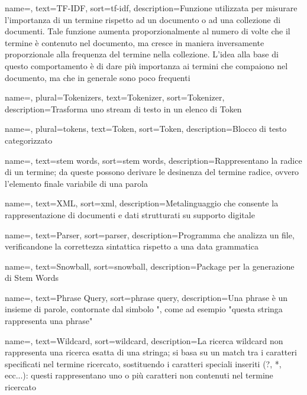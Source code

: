 {
	name=,
	text=TF-IDF,
	sort=tf-idf,
	description={Funzione utilizzata per misurare l'importanza di un termine rispetto ad un documento o ad una collezione di documenti. Tale funzione aumenta proporzionalmente al numero di volte che il termine è contenuto nel documento, ma cresce in maniera inversamente proporzionale alla frequenza del termine nella collezione. L'idea alla base di questo comportamento è di dare più importanza ai termini che compaiono nel documento, ma che in generale sono poco frequenti}
}

{
	name=,
	plural=Tokenizers,
	text=Tokenizer,
	sort=Tokenizer,
	description={Trasforma uno stream di testo in un elenco di \gls{Token}}
}

{
	name=,
	plural=tokens,
	text=Token,
	sort=Token,
	description={Blocco di testo categorizzato}
}

{
	name=,
	text=stem words,
	sort=stem words,
	description={Rappresentano la radice di un termine; da queste possono derivare le desinenza del termine radice, ovvero l'elemento finale variabile di una parola}
}

{
	name=,
	text=XML,
	sort=xml,
	description={Metalinguaggio che consente la rappresentazione di documenti e dati strutturati su supporto digitale}
}

{
	name=,
	text=Parser,
	sort=parser,
	description={Programma che analizza un file, verificandone la correttezza sintattica rispetto a una data grammatica}
}

{
	name=,
	text=Snowball,
	sort=snowball,
	description={Package per la generazione di \gls{Stem Words}}
}

{
	name=,
	text=Phrase Query,
	sort=phrase query,
	description={Una phrase è un insieme di parole, contornate dal simbolo ", come ad esempio "questa stringa rappresenta una phrase"}
}

{
	name=,
	text=Wildcard,
	sort=wildcard,
	description={La ricerca wildcard non rappresenta una ricerca esatta di una stringa; si basa su un match tra i caratteri specificati nel termine ricercato, sostituendo i caratteri speciali inseriti (?, *, ecc...): questi rappresentano uno o più caratteri non contenuti nel termine ricercato}
}

